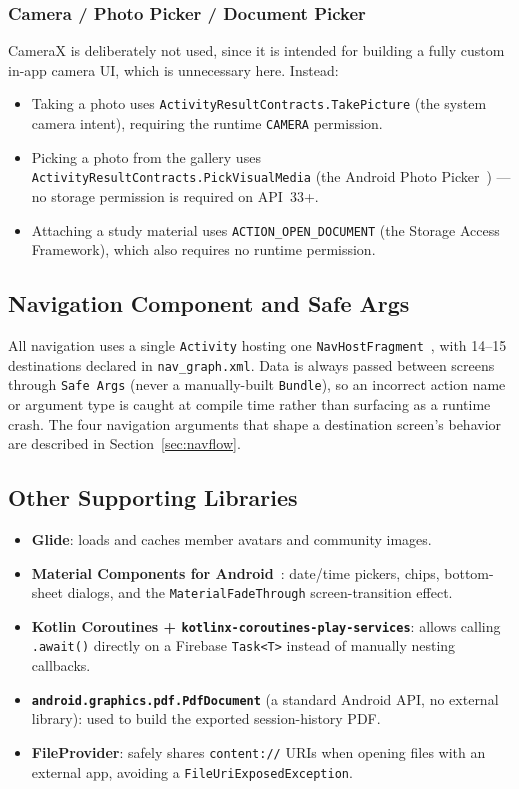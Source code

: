 \subsubsection{Camera / Photo Picker / Document Picker}
CameraX is deliberately not used, since it is intended for building a fully custom in-app camera UI, which is unnecessary here. Instead:
\begin{itemize}
    \item Taking a photo uses \texttt{ActivityResultContracts.TakePicture} (the system camera intent), requiring the runtime \texttt{CAMERA} permission.
    \item Picking a photo from the gallery uses \texttt{ActivityResultContracts.PickVisualMedia} (the Android Photo Picker~\cite{android-photopicker}) — no storage permission is required on API~33+.
    \item Attaching a study material uses \texttt{ACTION\_OPEN\_DOCUMENT} (the Storage Access Framework), which also requires no runtime permission.
\end{itemize}

\subsection{Navigation Component and Safe Args}

All navigation uses a single \texttt{Activity} hosting one \texttt{NavHostFragment}~\cite{android-navigation}, with 14--15 destinations declared in \texttt{nav\_graph.xml}. Data is always passed between screens through \texttt{Safe Args} (never a manually-built \texttt{Bundle}), so an incorrect action name or argument type is caught at compile time rather than surfacing as a runtime crash. The four navigation arguments that shape a destination screen's behavior are described in Section~\ref{sec:navflow}.

\subsection{Other Supporting Libraries}

\begin{itemize}
    \item \textbf{Glide}: loads and caches member avatars and community images.
    \item \textbf{Material Components for Android}~\cite{material-components}: date/time pickers, chips, bottom-sheet dialogs, and the \texttt{MaterialFadeThrough} screen-transition effect.
    \item \textbf{Kotlin Coroutines + \texttt{kotlinx-coroutines-play-services}}: allows calling \texttt{.await()} directly on a Firebase \texttt{Task<T>} instead of manually nesting callbacks.
    \item \textbf{\texttt{android.graphics.pdf.PdfDocument}} (a standard Android API, no external library): used to build the exported session-history PDF.
    \item \textbf{FileProvider}: safely shares \texttt{content://} URIs when opening files with an external app, avoiding a \texttt{FileUriExposedException}.
\end{itemize}
